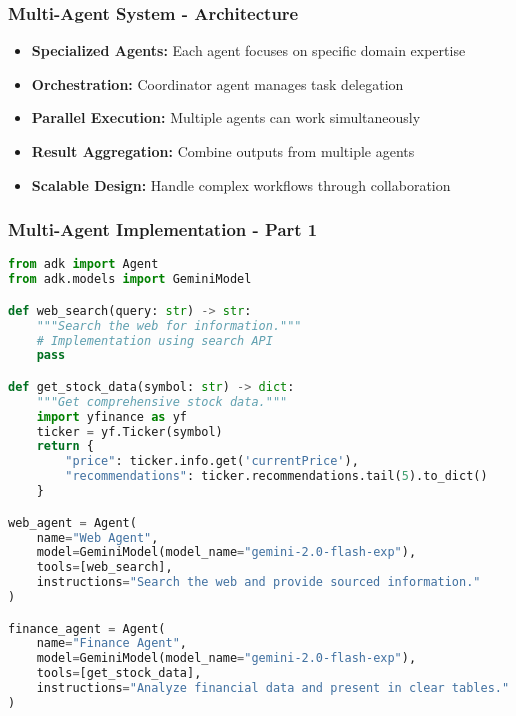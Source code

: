 \begin{frame}[fragile]\frametitle{Multi-Agent System - Architecture}
      \begin{itemize}
	\item \textbf{Specialized Agents:} Each agent focuses on specific domain expertise
	\item \textbf{Orchestration:} Coordinator agent manages task delegation
	\item \textbf{Parallel Execution:} Multiple agents can work simultaneously
	\item \textbf{Result Aggregation:} Combine outputs from multiple agents
	\item \textbf{Scalable Design:} Handle complex workflows through collaboration
	  \end{itemize}
\end{frame}

\begin{frame}[fragile]\frametitle{Multi-Agent Implementation - Part 1}
      
      \begin{lstlisting}[language=python, basicstyle=\tiny]
from adk import Agent
from adk.models import GeminiModel

def web_search(query: str) -> str:
    """Search the web for information."""
    # Implementation using search API
    pass

def get_stock_data(symbol: str) -> dict:
    """Get comprehensive stock data."""
    import yfinance as yf
    ticker = yf.Ticker(symbol)
    return {
        "price": ticker.info.get('currentPrice'),
        "recommendations": ticker.recommendations.tail(5).to_dict()
    }

web_agent = Agent(
    name="Web Agent",
    model=GeminiModel(model_name="gemini-2.0-flash-exp"),
    tools=[web_search],
    instructions="Search the web and provide sourced information."
)

finance_agent = Agent(
    name="Finance Agent",
    model=GeminiModel(model_name="gemini-2.0-flash-exp"),
    tools=[get_stock_data],
    instructions="Analyze financial data and present in clear tables."
)
      \end{lstlisting}
\end{frame}

